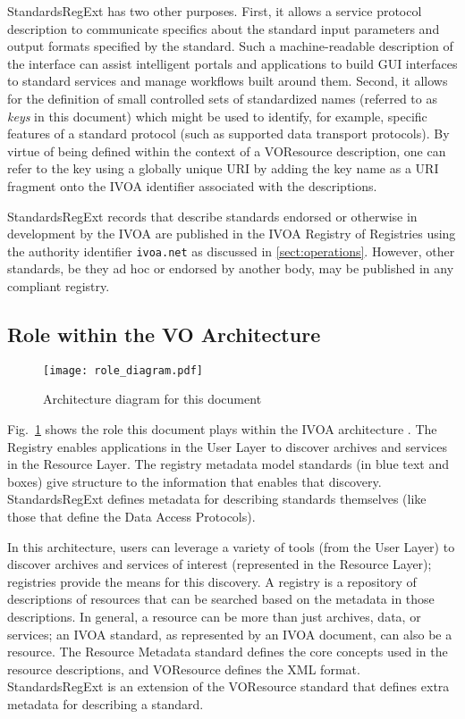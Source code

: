 \documentclass[11pt,a4paper]{ivoa}
\begin{document}
StandardsRegExt has two other purposes.  First, it allows a service
protocol description to communicate specifics about the standard input
parameters and output formats specified by the standard.  Such a
machine-readable description of the interface can assist intelligent
portals and applications to build GUI interfaces to standard services
and manage workflows built around them.  Second, it allows for the
definition of small controlled sets of standardized names (referred to
as \emph{keys} in this document) which might be used to identify,
for example, specific features of a standard protocol (such as
supported data transport protocols).  By virtue of being defined
within the context of a VOResource description, one can refer to the
key using a globally unique URI by adding the key name as a URI fragment
onto the IVOA identifier associated with the
descriptions.  



StandardsRegExt records that describe standards
endorsed or otherwise in development by the IVOA are published in
the IVOA Registry of Registries \citep{2007ivoa.rept.0628P} using the
authority identifier \texttt{ivoa.net} as discussed in
\ref{sect:operations}.
However, other standards, be they ad hoc or endorsed by another
body, may be published in any compliant registry.



\subsection{Role within the VO Architecture}

\begin{figure}
\centering
\texttt{[image: role\_diagram.pdf]}
\caption{Architecture diagram for this document}
\label{fig:archdiag}
\end{figure}

Fig.~\ref{fig:archdiag} shows the role this document plays within the
IVOA architecture \citep{2021ivoa.spec.1101D}.
The Registry enables applications in the User Layer to discover
archives and services in the Resource Layer.  The registry metadata
model standards (in blue text and boxes) give structure to the
information that enables that discovery.  StandardsRegExt defines metadata
for describing standards themselves (like those that define the Data
Access Protocols).  



In this architecture, users can leverage a variety of tools (from the
User Layer) to discover archives and services of interest (represented
in the Resource Layer); registries provide the means for this
discovery. A registry is a repository of descriptions of resources
that can be searched based on the metadata in those descriptions. In
general, a resource can be more than just archives, data, or
services; an IVOA standard, as represented by an IVOA document, can
also be a resource.  The Resource Metadata standard
defines the core concepts used in the resource
descriptions, and VOResource defines
the XML format.  StandardsRegExt is an extension of the VOResource
standard that defines extra metadata for describing a standard.  
\end{document}
